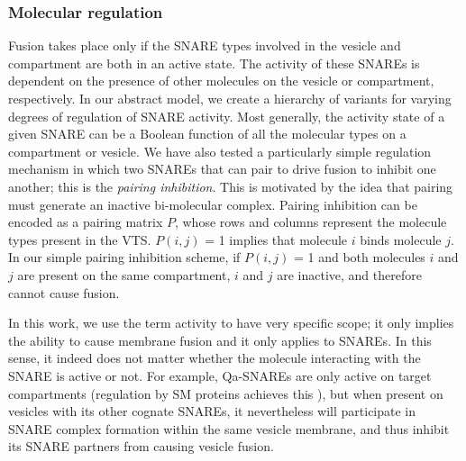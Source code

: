 \subsubsection{Molecular regulation} 
Fusion takes place only if the SNARE types involved in the vesicle and compartment are both in an active state.
%
The activity of these SNAREs is dependent on the presence of other molecules on the vesicle or compartment, respectively.
%
In our abstract model, 
we create a hierarchy of variants for varying degrees of regulation of SNARE activity.
%
Most generally, the activity state of a given SNARE can be a Boolean function of all the molecular types on a compartment or vesicle. 
%
We have also tested \cite{shukla2017discovering} a particularly simple regulation mechanism in which two SNAREs that can pair to drive fusion to inhibit one another; this is the \textit{pairing inhibition}. 
%
This is motivated by the idea that pairing must generate an inactive bi-molecular complex.
%
Pairing inhibition can be encoded as a pairing matrix $P$, whose rows and columns represent the molecule types present in the VTS. 
%
$P(i,j)$ = 1 implies that molecule $i$ binds molecule $j$.
%
In our simple pairing inhibition scheme, if $P(i,j)$ = 1 and both molecules $i$ and $j$ are present on the same compartment, $i$ and $j$ are inactive, and therefore cannot cause fusion.

In this work, we use the term activity to have very specific scope; it only implies the ability to cause membrane fusion and it only applies to SNAREs. 
%
In this sense, it indeed does not matter whether the molecule interacting with the SNARE is active or not. 
%
For example, Qa-SNAREs are only active on target compartments (regulation by SM proteins achieves this \cite{baker2016chaperoning}), but when present on vesicles with its other cognate SNAREs, it nevertheless will participate in SNARE complex formation within the same vesicle membrane, and thus inhibit its SNARE partners from causing vesicle fusion.

